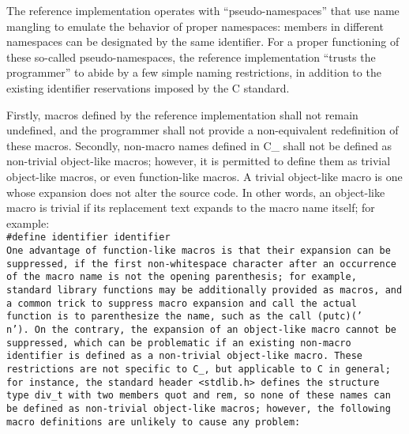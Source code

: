 \def\Subsection#1{\subsection{#1}}

The reference implementation operates with ``pseudo-namespaces''
that use name mangling to emulate the behavior of proper namespaces:
members in different namespaces can be designated by the same identifier.
For a proper functioning of these so-called pseudo-namespaces,
the reference implementation ``trusts the programmer''
to abide by a few simple naming restrictions,
in addition to the existing identifier reservations imposed by the C standard.

Firstly, macros defined by the reference
implementation shall not remain undefined,
and the programmer shall not provide a
non-equivalent redefinition of these macros.
Secondly, non-macro names defined in C\_ shall
not be defined as non-trivial object-like macros;
however, it is permitted to define them as trivial
object-like macros, or even function-like macros.
A trivial object-like macro is one whose
expansion does not alter the source code.
In other words, an object-like macro is trivial if its
replacement text expands to the macro name itself; for example:\\

\tt{#define identifier identifier}\\

One advantage of function-like macros is that their expansion can be suppressed,
if the first non-whitespace character after an occurrence
of the macro name is not the opening parenthesis;
for example, standard library functions may be additionally provided as macros,
and a common trick to suppress macro expansion and call the actual
function is to parenthesize the name, such as the call \tt{(putc)('\\n')}.
On the contrary, the expansion of an object-like macro cannot be suppressed,
which can be problematic if an existing non-macro
identifier is defined as a non-trivial object-like macro.
These restrictions are not specific to C\_,
but applicable to C in general; for instance,
the standard header \tt{<stdlib.h>} defines the structure
type \tt{div_t} with two members \tt{quot} and \tt{rem},
so none of these names can be defined as non-trivial object-like macros;
however, the following macro definitions are unlikely to cause any problem:\\

